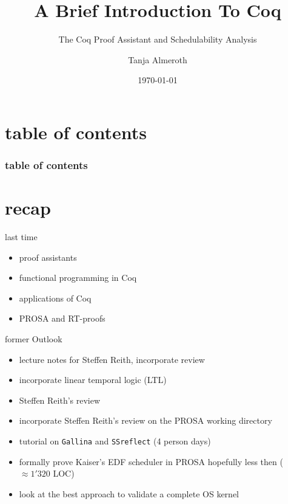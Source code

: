 \documentclass{beamer}
\title{A Brief Introduction To Coq}
\subtitle{The Coq Proof Assistant and Schedulability Analysis}
\author{Tanja Almeroth}
\institute{Studienbereich DCSM\\Hochschule {\Medium RheinMain}}
\date{\today}
\begin{document}
	
	\maketitle
		
	\section*{table of contents}
	
		\begin{frame}
			\frametitle{table of contents}
			\tableofcontents[hideallsubsections]
		\end{frame}
	
	


	\section{recap}
	
	\begin{frame}{last time}
		\begin{itemize}
			\item proof assistants
			\item functional programming in Coq
			\item applications of Coq
			\item PROSA	and RT-proofs
		\end{itemize}
	\end{frame}


	\begin{frame}{former Outlook}
		 \begin{itemize}
		 	 \item lecture notes for Steffen Reith, incorporate  review
		 	 \item incorporate linear temporal logic (LTL)
			  \item Steffen Reith's review 
			  \item incorporate Steffen Reith's review on the PROSA working directory
		      \item tutorial on \texttt{Gallina} and \texttt{SSreflect} (4 person days)
			   \item formally prove Kaiser's EDF scheduler in PROSA hopefully less then ($\approx 1'320$ LOC)
			  \item look at the best approach to validate a complete OS kernel
			  \end{itemize}
	 \end{frame}
	 
\end{document}
